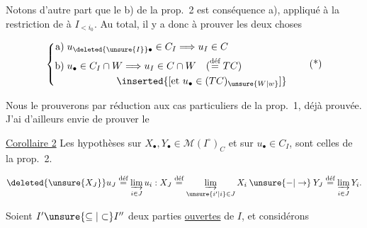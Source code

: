 Notons d’autre part que le b) de la prop.~2  est conséquence  a), appliqué  à la restriction de  à $I_{<i_0}$. Au total, il y a donc à prouver  les deux choses

\[
\left\{\begin{aligned}
 \text{a)}\;&u_{\deleted{\unsure{I}}\bullet}\in C_I\Longrightarrow u_I\in C\\
 \text{b)}\;&u_\bullet\in C_I\cap W\Longrightarrow u_I\in C\cap W\quad(\overset{\text{déf}}{=}TC)\\
 &\hspace{5em}\inserted{[\text{et }u_\bullet\in(TC)_{\unsure{W|w}}]}
\end{aligned}\right. \tag*{(*)}
\]

Nous le prouverons par réduction  aux cas particuliers de la prop.~1, déjà prouvée. J’ai d’ailleurs  envie de prouver le

\uline{Corollaire 2} Les hypothèses  sur $X_\bullet,Y_\bullet\in\mathcal M(I^\circ)_C$ et sur $u_\bullet\in C_I$,  sont celles de la prop.~2.   

\[
 \deleted{\unsure{X_J}}u_J\overset{\text{déf}}{=}\underset{i\in J}{\underrightarrow{\lim}}\,u_i:
 X_J\overset{\text{déf}}{=}\underset{\unsure{i'|i}\in J}{\underrightarrow{\lim}}\,X_i
 \mathbin{\unsure{-|\to}} Y_J\overset{\text{déf}}{=}\underset{i\in J}{\underrightarrow{\lim}}\,Y_i .
\]

Soient $I'\unsure{\subseteq|\subset} I''$ deux parties \uline{ouvertes} de $I$, et considérons  



